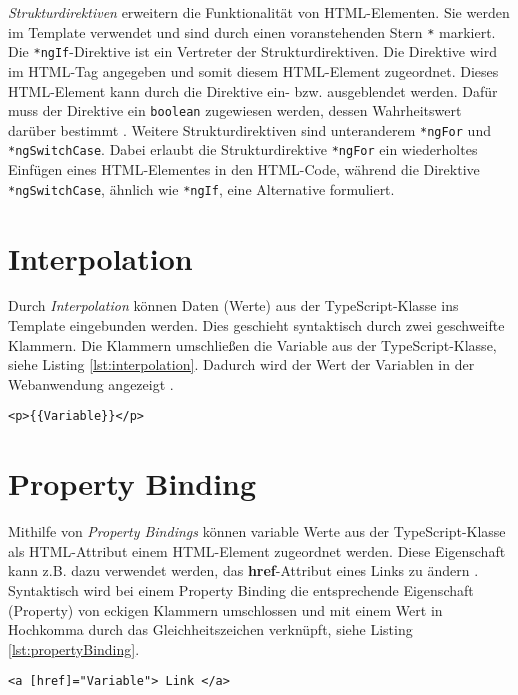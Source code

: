 \textit{Strukturdirektiven} erweitern die Funktionalität von HTML-Elementen. Sie werden im Template verwendet und sind durch einen voranstehenden Stern \texttt{*} markiert. Die \texttt{*ngIf}-Direktive ist ein Vertreter der Strukturdirektiven. Die Direktive wird im HTML-Tag angegeben und somit diesem HTML-Element zugeordnet. 
Dieses HTML-Element kann durch die Direktive ein- bzw. ausgeblendet werden. Dafür muss der Direktive ein \texttt{boolean} zugewiesen werden, dessen Wahrheitswert darüber bestimmt \cite{Book2020}\cite{NgIf2021}.
Weitere Strukturdirektiven sind unteranderem \texttt{*ngFor} und \texttt{*ngSwitchCase}. Dabei erlaubt die Strukturdirektive \texttt{*ngFor} ein wiederholtes Einfügen eines HTML-Elementes in den HTML-Code, während die Direktive \texttt{*ngSwitchCase}, ähnlich wie \texttt{*ngIf}, eine Alternative formuliert. 

\section{Interpolation}

Durch \textit{Interpolation} können Daten (Werte) aus der TypeScript-Klasse ins Template eingebunden werden. Dies geschieht syntaktisch durch zwei geschweifte Klammern. Die Klammern umschließen die Variable aus der TypeScript-Klasse, siehe Listing \ref{lst:interpolation}. Dadurch wird der Wert der Variablen in der Webanwendung angezeigt \cite{Book2020}\cite{interpolation2021}. 
\begin{lstlisting}[caption=Interpolation im Template, label=lst:interpolation]
    <p>{{Variable}}</p>
\end{lstlisting}

\section{Property Binding}\label{subsec:propertyBinding}
Mithilfe von \textit{Property Bindings} können variable Werte aus der TypeScript-Klasse als HTML-Attribut einem HTML-Element zugeordnet werden. Diese Eigenschaft kann z.B. dazu verwendet werden, das \textbf{href}-Attribut eines Links zu ändern \cite{Book2020}\cite{propertyBinding2021}. 
Syntaktisch wird bei einem Property Binding die entsprechende Eigenschaft (Property) von eckigen Klammern umschlossen und mit einem Wert in Hochkomma durch das Gleichheitszeichen verknüpft, siehe Listing \ref{lst:propertyBinding}.
\begin{lstlisting}[caption=Property Binding, label=lst:propertyBinding]
    <a [href]="Variable"> Link </a>
\end{lstlisting}
